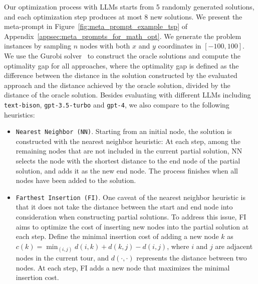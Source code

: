 Our optimization process with LLMs starts from 5 randomly generated solutions, and each optimization step produces at most 8 new solutions. 
We present the meta-prompt in Figure~\ref{fig:meta_prompt_example_tsp} of Appendix~\ref{appsec:meta_prompts_for_math_opt}. 
We generate the problem instances by sampling $n$ nodes with both $x$ and $y$ coordinates in $[-100, 100]$. 
We use the Gurobi solver~\citep{optimization2020gurobi} to construct the oracle solutions and compute the optimality gap for all approaches, where the optimality gap is defined as the difference between the distance in the solution constructed by the evaluated approach and the distance achieved by the oracle solution, divided by the distance of the oracle solution. 
Besides evaluating \name{} with different LLMs including \texttt{text-bison}, \texttt{gpt-3.5-turbo} and \texttt{gpt-4}, we also compare \name{} to the following heuristics:

\begin{itemize}[leftmargin=2em,topsep=0pt,partopsep=1ex,parsep=0ex]

\item \texttt{Nearest Neighbor (NN)}. Starting from an initial node, the solution is constructed with the nearest neighbor heuristic: At each step, among the remaining nodes that are not included in the current partial solution, NN selects the node with the shortest distance to the end node of the partial solution, and adds it as the new end node. The process finishes when all nodes have been added to the solution.

\item \texttt{Farthest Insertion (FI)}. One caveat of the nearest neighbor heuristic is that it does not take the distance between the start and end node into consideration when constructing partial solutions. To address this issue, FI aims to optimize the cost of inserting new nodes into the partial solution at each step. Define the minimal insertion cost of adding a new node $k$ as $c(k) = \min_{(i, j)} d(i, k) + d(k, j) - d(i, j)$, where $i$ and $j$ are adjacent nodes in the current tour, and $d(\cdot, \cdot)$ represents the distance between two nodes. At each step, FI adds a new node that maximizes the minimal insertion cost.

\end{itemize}

